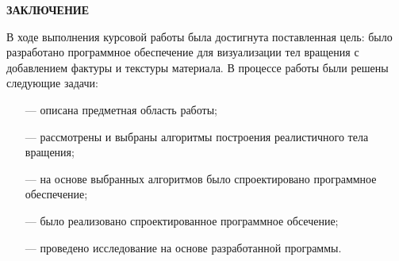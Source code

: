 \begin{center}
    \textbf{ЗАКЛЮЧЕНИЕ}
\end{center}

В ходе выполнения курсовой работы была достигнута поставленная цель: было разработано программное обеспечение для визуализации тел вращения с добавлением фактуры и текстуры материала. 
В процессе работы были решены следующие задачи:
\begin{itemize}
    \item[---] описана предметная область работы;
    \item[---] рассмотрены и выбраны алгоритмы построения реалистичного тела вращения;
    \item[---] на основе выбранных алгоритмов было спроектировано программное обеспечение;
    \item[---] было реализовано спроектированное программное обсечение;
    \item[---] проведено исследование на основе разработанной программы.
\end{itemize}